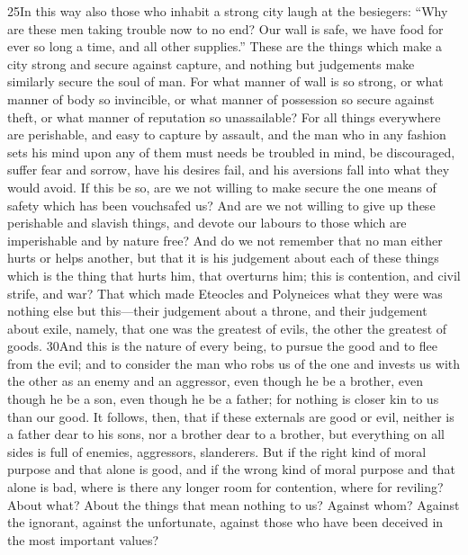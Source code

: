 25In this way also those who inhabit a strong city laugh at the besiegers: ``Why are these men taking trouble now to no end? Our wall is safe, we have food for ever so long a time, and all other supplies.'' These are the things which make a city strong and secure against capture, and nothing but judgements make similarly secure the soul of man. For what manner of wall is so strong, or what manner of body so invincible, or what manner of possession so secure against theft, or what manner of reputation so unassailable? For all things everywhere are perishable, and easy to capture by assault, and the man who in any fashion sets his mind upon any of them must needs be troubled in mind, be discouraged, suffer fear and sorrow, have his desires fail, and his aversions fall into what they would avoid. If this be so, are we not willing to make secure the one means of safety which has been vouchsafed us? And are we not willing to give up these perishable and slavish things, and devote our labours to those which are imperishable and by nature free? And do we not remember that no man either hurts or helps another, but that it is his judgement about each of these things which is the thing that hurts him, that overturns him; this is contention, and civil strife, and war? That which made Eteocles and Polyneices what they were was nothing else but this—their judgement about a throne, and their judgement about exile, namely, that one was the greatest of evils, the other the greatest of goods. 30And this is the nature of every being, to pursue the good and to flee from the evil; and to consider the man who robs us of the one and invests us with the other as an enemy and an aggressor, even though he be a brother, even though he be a son, even though he be a father; for nothing is closer kin to us than our good. It follows, then, that if these externals are good or evil, neither is a father dear to his sons, nor a brother dear to a brother, but everything on all sides is full of enemies, aggressors, slanderers. But if the right kind of moral purpose and that alone is good, and if the wrong kind of moral purpose and that alone is bad, where is there any longer room for contention, where for reviling? About what? About the things that mean nothing to us? Against whom? Against the ignorant, against the unfortunate, against those who have been deceived in the most important values?

